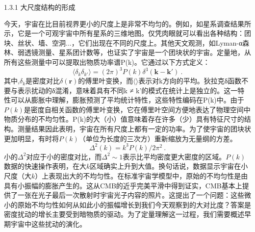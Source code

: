 

1.3.1 大尺度结构的形成

今天，宇宙在比目前视界更小的尺度上是非常不均匀的。例如，如星系调查结果所示，它是一个可观宇宙中所有星系的三维地图。仅凭肉眼就可以看出各种结构：团块、丝状、墙、空洞...，它们出现在不同的尺度上。其他天文观测，如Lyman-α森林、弱透镜测量、星系团计数等，也证实了宇宙是一个团块状的宇宙。定量地，从所有这些测量中可以提取出物质功率谱P(k)。它通过以下方式定义：
\begin{equation}
\langle \delta_k \delta_{k'} \rangle = (2\pi)^3 P(k) \delta^3(\mathbf k - \mathbf k')~.
\end{equation}
其中,$\delta_k$是密度对比$\delta(\mathbf r)$的傅里叶变换，而$\langle\rangle$表示对k方向的平均。狄拉克δ函数不要与表示扰动的δ混淆，意味着具有不同k ≠ k'的模式在统计上是独立的。这一特性可以从膨胀中理解，膨胀预测了平均统计特性，这些特性编码在P(k)中。由于$P(k)$是密度自相关函数的傅里叶变换，它在傅里叶空间方便地表达了物理空间中物质分布的不均匀性。P(k)的大（小）值意味着存在许多（少）具有特征尺寸的结构。测量结果因此表明，宇宙在所有尺度上都有一定的功率。为了使宇宙的团块状更加明显，有时将$P(k)$（单位为长度的三次方）重新缩放为无量纲的方差。
\begin{equation}
\Delta^2(k) = k^3 P(k) /2\pi^2~.
\end{equation}
小的$\Delta^2$对应于小的密度对比，而$\Delta^2\sim 1$表示比平均密度更大密度的区域。$P(k)$数据的快速操作表明，在大$k$区域确实上升到大值。换句话说，数据显示宇宙在小尺度（大$k$）上表现出大的不均匀性。在标准宇宙学模型中，原始的不均匀性是由具有小振幅的膨胀产生的。这从CMB的近乎完美平滑中得到证实，CMB基本上提供了一张在光子最后一次散射时宇宙光子内容的照片。这提出了一个问题：这些微小的原始不均匀性如何从如此小的振幅增长到我们今天观察到的大对比度？答案是密度扰动的增长主要受到暗物质的驱动。为了定量理解这一过程，我们需要概述早期宇宙中这些扰动的演化。

